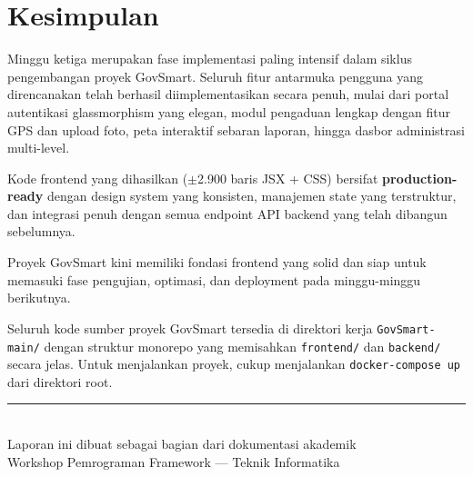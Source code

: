 \documentclass[12pt,a4paper]{article}
\begin{document}
\section{Kesimpulan}

Minggu ketiga merupakan fase implementasi paling intensif dalam siklus pengembangan
proyek GovSmart. Seluruh fitur antarmuka pengguna yang direncanakan telah berhasil
diimplementasikan secara penuh, mulai dari portal autentikasi glassmorphism yang
elegan, modul pengaduan lengkap dengan fitur GPS dan upload foto, peta interaktif
sebaran laporan, hingga dasbor administrasi multi-level.

Kode frontend yang dihasilkan ($\pm$2.900 baris JSX + CSS) bersifat
\textbf{production-ready} dengan design system yang konsisten, manajemen state
yang terstruktur, dan integrasi penuh dengan semua endpoint API backend yang telah
dibangun sebelumnya.

Proyek GovSmart kini memiliki fondasi frontend yang solid dan siap untuk
memasuki fase pengujian, optimasi, dan deployment pada minggu-minggu berikutnya.

\begin{infobox}
  Seluruh kode sumber proyek GovSmart tersedia di direktori kerja
  \texttt{GovSmart-main/} dengan struktur monorepo yang memisahkan
  \texttt{frontend/} dan \texttt{backend/} secara jelas. Untuk menjalankan
  proyek, cukup menjalankan \texttt{docker-compose up} dari direktori root.
\end{infobox}

\vspace{1em}
\noindent\rule{\textwidth}{0.5pt}\\[0.3em]
{\small\color{gray}
Laporan ini dibuat sebagai bagian dari dokumentasi akademik\\
Workshop Pemrograman Framework --- Teknik Informatika}
\end{document}
